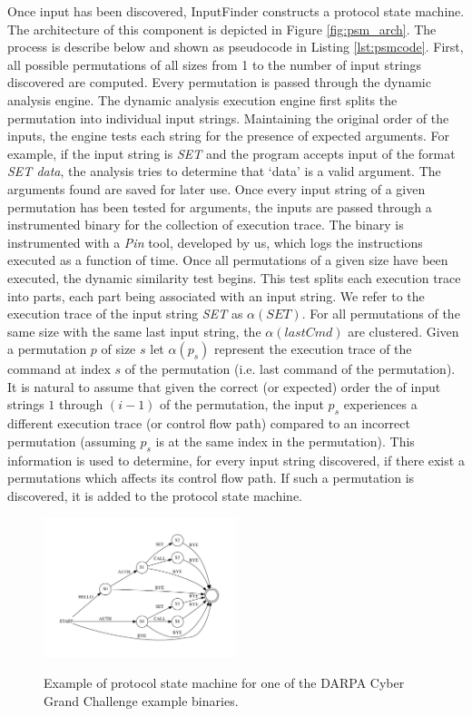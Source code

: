 \documentclass{acm_proc_article-sp}
\def \tool {InputFinder}
\begin{document}
Once input has been discovered, \tool{} constructs a protocol state machine.
The architecture of this component is depicted in Figure \ref{fig:psm_arch}.
The process is describe below and shown as pseudocode in Listing \ref{lst:psmcode}.
First, all possible permutations of all sizes from 1 to the number of input strings discovered are computed.
Every permutation is passed through the dynamic analysis engine.
The dynamic analysis execution engine first splits the permutation into individual input strings.
Maintaining the original order of the inputs, the engine tests each string for the presence of expected arguments.
For example, if the input string is \textit{SET} and the program accepts input of the format \textit{SET data}, the analysis tries to determine that `data' is a valid argument.
The arguments found are saved for later use.
Once every input string of a given permutation has been tested for arguments, the inputs are passed through a instrumented binary for the collection of execution trace.
The binary is instrumented with a \textit{Pin} tool, developed by us, which logs the instructions executed as a function of time.
Once all permutations of a given size have been executed, the dynamic similarity test begins.
This test splits each execution trace into parts, each part being associated with an input string.
We refer to the execution trace of the input string \textit{SET} as $\alpha(SET)$.
For all permutations of the same size with the same last input string, the $\alpha(lastCmd)$ are clustered.
Given a permutation $p$ of size $s$ let $\alpha(p_s)$ represent the execution trace of the command at index $s$ of the permutation (i.e. last command of the permutation).
It is natural to assume that given the correct (or expected) order the of input strings $1$ through $(i-1)$ of the permutation, the input $p_s$ experiences a different execution trace (or control flow path) compared to an incorrect permutation (assuming $p_s$ is at the same index in the permutation).
This information is used to determine, for every input string discovered, if there exist a permutations which affects its control flow path.
If such a permutation is discovered, it is added to the protocol state machine.

\begin{figure}[h!]
\caption{Example of protocol state machine for one of the DARPA Cyber Grand Challenge example binaries.}
\centering
\includegraphics[width=0.5\textwidth]{protocoldiagram}
\label{fig:psm_example}
\end{figure}
\end{document}
